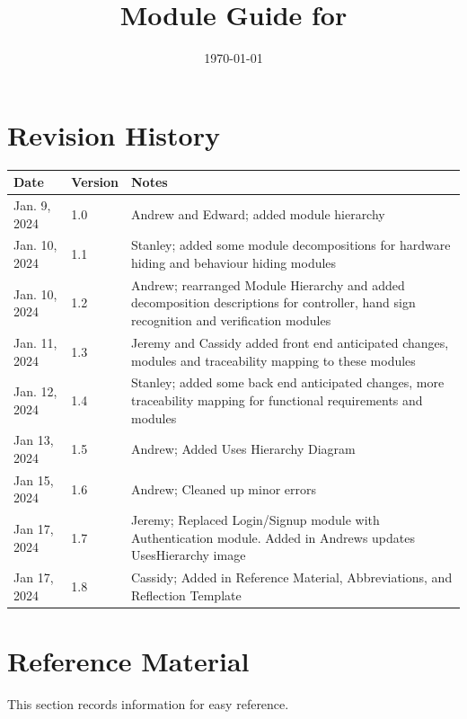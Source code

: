 \documentclass[12pt, titlepage]{article}
\begin{document}
\title{Module Guide for \progname{}} 
\author{\authname}
\date{\today}

\maketitle


\section{Revision History}

\begin{tabularx}{\textwidth}{p{3cm}p{2cm}X}
\toprule {\bf Date} & {\bf Version} & {\bf Notes}\\
\midrule
Jan. 9, 2024 & 1.0 & Andrew and Edward; added module hierarchy\\
Jan. 10, 2024 & 1.1 & Stanley; added some module decompositions for hardware hiding and behaviour hiding modules\\
Jan. 10, 2024 & 1.2 & Andrew; rearranged Module Hierarchy and added decomposition descriptions for controller, hand sign recognition and verification modules\\
Jan. 11, 2024 & 1.3 & Jeremy and Cassidy added front end anticipated changes, modules and traceability mapping to these modules\\
Jan. 12, 2024 & 1.4 & Stanley; added some back end anticipated changes, more traceability mapping for functional requirements and modules\\
Jan 13, 2024 & 1.5 & Andrew; Added Uses Hierarchy Diagram\\
Jan 15, 2024 & 1.6 & Andrew; Cleaned up minor errors\\
Jan 17, 2024 & 1.7 & Jeremy; Replaced Login/Signup module with Authentication module. Added in Andrews updates UsesHierarchy image\\
Jan 17, 2024 & 1.8 & Cassidy; Added in Reference Material, Abbreviations, and Reflection Template\\
\bottomrule
\end{tabularx}

\newpage

\section{Reference Material}

This section records information for easy reference. \\
\end{document}
